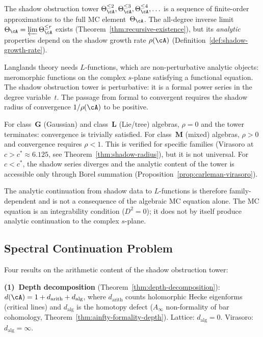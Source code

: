 \begin{remark}%
\label{rem:langlands-gap-c}%
%
%
\ClaimStatusConditional{}
The shadow obstruction tower
$\Theta_\cA^{\le 2}, \Theta_\cA^{\le 3},
\Theta_\cA^{\le 4}, \ldots$
is a sequence of finite-order approximations to the
full MC element~$\Theta_\cA$. The all-degree inverse
limit $\Theta_\cA = \varprojlim \Theta_\cA^{\le r}$
exists (Theorem~\ref{thm:recursive-existence}), but
its \emph{analytic} properties depend on the shadow
growth rate $\rho(\cA)$
(Definition~\ref{def:shadow-growth-rate}).

Langlands theory needs $L$-functions, which are
non-perturbative analytic objects: meromorphic functions
on the complex $s$-plane satisfying a functional equation.
The shadow obstruction tower is perturbative: it is a formal power
series in the degree variable~$t$. The passage from
formal to convergent requires the shadow radius of
convergence $1/\rho(\cA)$ to be positive.

For class~$\mathbf{G}$ (Gaussian) and
class~$\mathbf{L}$ (Lie/tree) algebras,
$\rho = 0$ and the tower terminates: convergence is
trivially satisfied. For class~$\mathbf{M}$ (mixed)
algebras, $\rho > 0$ and convergence requires
$\rho < 1$. This is verified for specific families
(Virasoro at $c > c^* \approx 6.125$, see
Theorem~\ref{thm:shadow-radius}), but it is not universal.
For $c < c^*$, the shadow series diverges and the
analytic content of the tower is accessible only through
Borel summation
(Proposition~\ref{prop:carleman-virasoro}).

The analytic continuation from shadow data to
$L$-functions is therefore family-dependent and is not
a consequence of the algebraic MC equation alone.
The MC equation is an integrability condition ($D^2 = 0$);
it does not by itself produce analytic continuation
to the complex $s$-plane.
\end{remark}

\subsection{Spectral Continuation Problem}
\label{subsec:concordance-spectral-continuation}

Four results on the arithmetic content of the shadow obstruction tower:

\smallskip\noindent
\textbf{(1)~Depth decomposition}
(Theorem~\ref{thm:depth-decomposition}):
$d(\cA) = 1 + d_{\mathrm{arith}} + d_{\mathrm{alg}}$,
where $d_{\mathrm{arith}}$ counts holomorphic Hecke eigenforms
(critical lines) and $d_{\mathrm{alg}}$ is the homotopy defect
($A_\infty$ non-formality of bar cohomology,
Theorem~\ref{thm:ainfty-formality-depth}).
Lattice: $d_{\mathrm{alg}} = 0$.
Virasoro: $d_{\mathrm{alg}} = \infty$.

